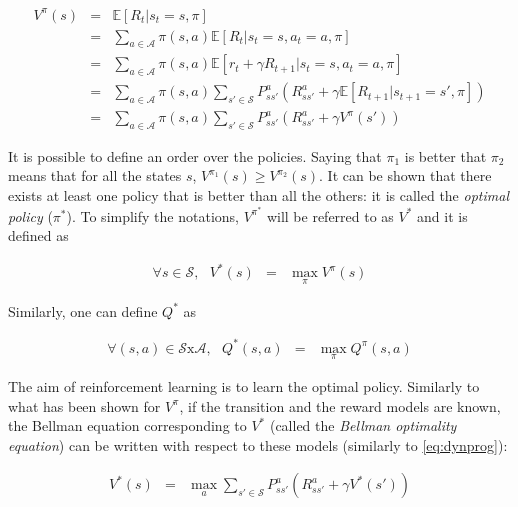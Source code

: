         \begin{eqnarray}
          	V^{\pi} (s)   & = & \mathbb{E} [R_t | s_t = s, \pi] \nonumber \\
           	& = & \sum_{a \in \mathcal{A}} \pi (s,a) \mathbb{E} [R_t | s_t = s, a_t = a, \pi] \nonumber \\
            & = & \sum_{a \in \mathcal{A}} \pi (s,a) \mathbb{E} [r_t + \gamma R_{t+1} | s_t = s, a_t = a, \pi] \nonumber \\
            & = & \sum_{a \in \mathcal{A}} \pi (s,a)  \sum_{s' \in \mathcal{S}} P_{ss'}^a (R_{ss'}^a + \gamma \mathbb{E} [R_{t+1} | s_{t+1} = s', \pi]) \nonumber \\
            & = & \sum_{a \in \mathcal{A}} \pi (s,a)  \sum_{s' \in \mathcal{S}} P_{ss'}^a (R_{ss'}^a + \gamma V^{\pi} (s')) \label{eq:dynprog}
        \end{eqnarray}
            
      	It is possible to define an order over the policies. Saying that $\pi_1$ is better that $\pi_2$ means that for all the states $s$, $V^{\pi_1} (s) \geq V^{\pi_2} (s)$. It can be shown that there exists at least one policy that is better than all the others: it is called the \textit{optimal policy} ($\pi^*$). To simplify the notations, $V^{\pi^*}$ will be referred to as $V^*$ and it is defined as
					
					\begin{eqnarray}
						\forall s \in \mathcal{S}, \text{ } V^* (s) & = & \max_\pi V^\pi (s) \label{eq:voptim}
					\end{eqnarray}
            
       	Similarly, one can define $Q^*$ as
					
					\begin{eqnarray}
						\forall (s,a) \in \mathcal{S} \text{x} \mathcal{A}, \text{ } Q^*(s,a) & = & \max_\pi Q^{\pi}(s,a) \label{eq:qoptim}
					\end{eqnarray}

        The aim of reinforcement learning is to learn the optimal policy. Similarly to what has been shown for $V^{\pi}$, if the transition and the reward models are known, the Bellman equation corresponding to $V^*$ (called the \textit{Bellman optimality equation}) can be written with respect to these models (similarly to \ref{eq:dynprog}):
								
					\begin{eqnarray}
						V^*(s) & = & \max_a \sum_{s' \in \mathcal{S}} P_{ss'}^a (R_{ss'}^a + \gamma V^*(s')) \label{eq:vbellmanoptim}
					\end{eqnarray}
        
